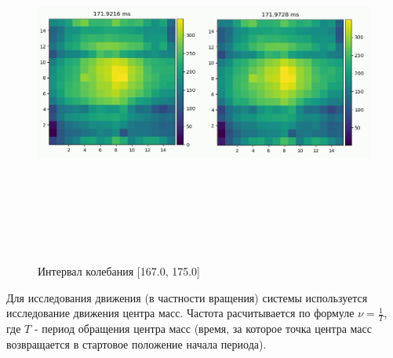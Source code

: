 \documentclass[a4paper,12pt]{article} %
\begin{document}
	\begin{figure}[H]
		\centering
		\includegraphics[width = 18cm, height = 12cm]{Fluct_prj.png}
		\caption{Интервал колебания [167.0, 175.0]}
		\label{fig:fluct_prj}
	\end{figure}
	Для исследования движения (в частности вращения) системы используется исследование движения центра масс. Частота расчитывается по формуле $\nu = \frac{1}{T}$, где $T$ - период обращения центра масс (время, за которое точка центра масс возвращается в стартовое положение начала периода).
\end{document}
